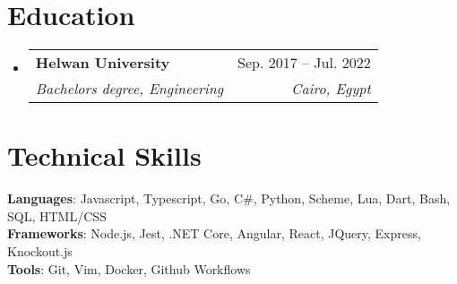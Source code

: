 \documentclass[letterpaper,11pt]{article}
\makeatletter
\newcommand{\resumeSubheading}[4]{
  \vspace{-2pt}\item
    \begin{tabular*}{0.97\textwidth}[t]{l@{\extracolsep{\fill}}r}
      \textbf{#1} & #2 \\
      \textit{\small#3} & \textit{\small #4} \\
    \end{tabular*}\vspace{-7pt}
}
\newcommand{\resumeSubHeadingListStart}{\begin{itemize}[leftmargin=0.15in, label={}]}
\newcommand{\resumeSubHeadingListEnd}{\end{itemize}}
\makeatother
\begin{document}
\section{Education}
  \resumeSubHeadingListStart
    \resumeSubheading
      {Helwan University}{Sep. 2017 -- Jul. 2022}
      {Bachelors degree, Engineering}{Cairo, Egypt}
\resumeSubHeadingListEnd

%
\section{Technical Skills}
 \begin{itemize}[leftmargin=0.15in, label={}]
    \small{\item{
     \textbf{Languages}{: Javascript, Typescript, Go, C\#, Python, Scheme, Lua, Dart, Bash,  SQL, HTML/CSS} \\
     \textbf{Frameworks}{: Node.js, Jest, .NET Core, Angular, React, JQuery, Express, Knockout.js } \\
     \textbf{Tools}{: Git, Vim, Docker, Github Workflows} 
    }}
 \end{itemize}


\end{document}
